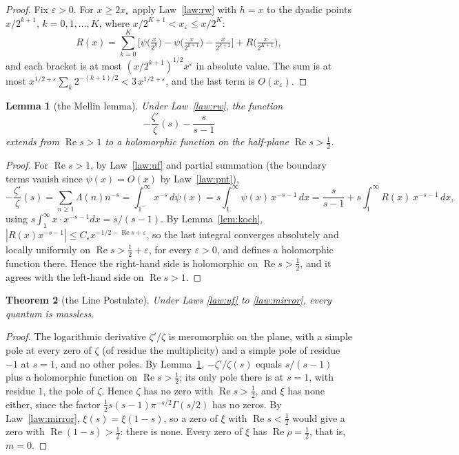 \documentclass[11pt]{article}
\newtheorem{theorem}{Theorem}[section]
\newtheorem{lemma}[theorem]{Lemma}
\theoremstyle{definition}
\theoremstyle{remark}
\newcommand{\Ree}{\operatorname{Re}}
\newcommand{\ps}{\psi}
\begin{document}
\begin{proof}
Fix $\varepsilon>0$. For $x\ge2x_\varepsilon$ apply Law~\ref{law:rw} with $h=x$ to the dyadic points $x/2^{k+1}$, $k=0,1,\dots,K$, where $x/2^{K+1}<x_\varepsilon\le x/2^K$:
\[
R(x)=\sum_{k=0}^{K}\Big[\ps\big(\tfrac{x}{2^k}\big)-\ps\big(\tfrac{x}{2^{k+1}}\big)-\tfrac{x}{2^{k+1}}\Big]+R\big(\tfrac{x}{2^{K+1}}\big),
\]
and each bracket is at most $(x/2^{k+1})^{1/2}x^{\varepsilon}$ in absolute value. The sum is at most $x^{1/2+\varepsilon}\sum_k2^{-(k+1)/2}<3\,x^{1/2+\varepsilon}$, and the last term is $O(x_\varepsilon)$.
\end{proof}

\begin{lemma}[the Mellin lemma]\label{lem:mellin}
Under Law~\ref{law:rw}, the function
\[
-\frac{\zeta'}{\zeta}(s)-\frac{s}{s-1}
\]
extends from $\Ree s>1$ to a holomorphic function on the half-plane $\Ree s>\tfrac12$.
\end{lemma}

\begin{proof}
For $\Ree s>1$, by Law~\ref{law:uf} and partial summation (the boundary terms vanish since $\ps(x)=O(x)$ by Law~\ref{law:pnt}),
\[
-\frac{\zeta'}{\zeta}(s)=\sum_{n\ge1}\Lambda(n)n^{-s}=\int_{1^-}^{\infty}x^{-s}\,d\ps(x)=s\int_1^\infty\ps(x)\,x^{-s-1}\,dx
= \frac{s}{s-1}+s\int_1^\infty R(x)\,x^{-s-1}\,dx ,
\]
using $s\int_1^\infty x\cdot x^{-s-1}dx=s/(s-1)$. By Lemma~\ref{lem:koch}, $|R(x)x^{-s-1}|\le C_\varepsilon x^{-1/2-\Ree s+\varepsilon}$, so the last integral converges absolutely and locally uniformly on $\Ree s>\tfrac12+\varepsilon$, for every $\varepsilon>0$, and defines a holomorphic function there. Hence the right-hand side is holomorphic on $\Ree s>\tfrac12$, and it agrees with the left-hand side on $\Ree s>1$.
\end{proof}

\begin{theorem}[the Line Postulate]\label{thm:line}
Under Laws \ref{law:uf} to \ref{law:mirror}, every quantum is massless.
\end{theorem}

\begin{proof}
The logarithmic derivative $\zeta'/\zeta$ is meromorphic on the plane, with a simple pole at every zero of $\zeta$ (of residue the multiplicity) and a simple pole of residue $-1$ at $s=1$, and no other poles. By Lemma~\ref{lem:mellin}, $-\zeta'/\zeta(s)$ equals $s/(s-1)$ plus a holomorphic function on $\Ree s>\tfrac12$; its only pole there is at $s=1$, with residue $1$, the pole of $\zeta$. Hence $\zeta$ has no zero with $\Ree s>\tfrac12$, and $\xi$ has none either, since the factor $\tfrac12s(s-1)\pi^{-s/2}\Gamma(s/2)$ has no zeros. By Law~\ref{law:mirror}, $\xi(s)=\xi(1-s)$, so a zero of $\xi$ with $\Ree s<\tfrac12$ would give a zero with $\Ree(1-s)>\tfrac12$: there is none. Every zero of $\xi$ has $\Ree\rho=\tfrac12$, that is, $m=0$.
\end{proof}
\end{document}
